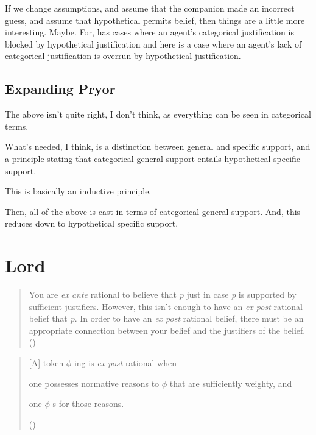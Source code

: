 \documentclass[10pt]{article}
\begin{document}
If we change assumptions, and assume that the companion made an incorrect guess, and assume that hypothetical permits belief, then things are a little more interesting.
Maybe.
For, \citeauthor{Pryor:2018aa} has cases where an agent's categorical justification is blocked by hypothetical justification and here is a case where an agent's lack of categorical justification is overrun by hypothetical justification.

\subsection{Expanding Pryor}
\label{sec:expanding-pryor}

The above isn't quite right, I don't think, as everything can be seen in categorical terms.

What's needed, I think, is a distinction between general and specific support, and a principle stating that categorical general support entails hypothetical specific support.

This is basically an inductive principle.

Then, all of the above is cast in terms of categorical general support.
And, this reduces down to hypothetical specific support.


\section{Lord}
\label{sec:lord}

\begin{quote}
  You are \emph{ex ante} rational to believe that \emph{p} just in case \emph{p} is supported by sufficient justifiers.
  However, this isn't enough to have an \emph{ex post} rational belief that \emph{p}.
  In order to have an \emph{ex post} rational belief, there must be an appropriate connection between your belief and the justifiers of the belief.\nolinebreak
  \mbox{}\hfill\mbox{(\citeyear[70]{Lord:2018aa})}
\end{quote}

\begin{quote}
  [A] token \(\phi\)-ing is \emph{ex post} rational when
  \begin{enumerate*}[label=(\roman*), ref=\roman*.]
  \item one possesses normative reasons to \(\phi\) that are sufficiently weighty, and
  \item one \(\phi\)-s for those reasons.
  \end{enumerate*}
  \nolinebreak
  \mbox{}\hfill\mbox{(\citeyear[10]{Lord:2018aa})}
\end{quote}
\end{document}
